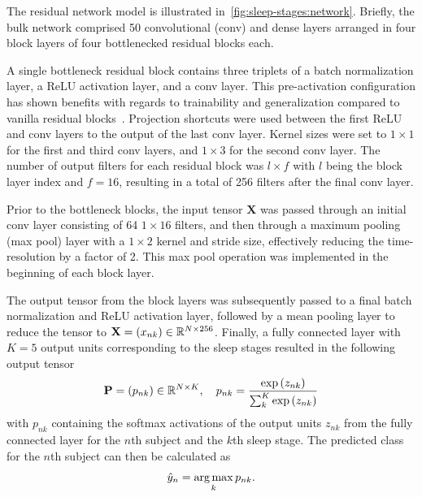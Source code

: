 The residual network model is illustrated in~\cref{fig:sleep-stages:network}. 
Briefly, the bulk network comprised 50 convolutional (conv) and dense layers arranged in four block layers of four bottlenecked residual blocks each. 

A single bottleneck residual block contains three triplets of a batch normalization layer, a \ac{ReLU} activation layer, and a conv layer. 
This pre-activation configuration has shown benefits with regards to trainability and generalization compared to vanilla residual blocks~\cite{He2016b}.
Projection shortcuts were used between the first \ac{ReLU} and conv layers to the output of the last conv layer.
Kernel sizes were set to $1\times1$ for the first and third conv layers, and $1\times3$ for the second conv layer.
The number of output filters for each residual block was $l\times f$ with $l$ being the block layer index and $f=16$, resulting in a total of 256 filters after the final conv layer.

Prior to the bottleneck blocks, the input tensor $\mathbf{X}$ was passed through an initial conv layer consisting of 64 $1\times16$ filters, and then through a maximum pooling (max pool) layer with a $1\times2$ kernel and stride size, effectively reducing the time-resolution by a factor of 2.
This max pool operation was implemented in the beginning of each block layer.

The output tensor from the block layers was subsequently passed to a final batch normalization and \ac{ReLU} activation layer, followed by a mean pooling layer to reduce the tensor to $\mathbf{X} = \left(x_{nk}\right) \in \real{N\times 256}$.
Finally, a fully connected layer with $K=5$ output units corresponding to the sleep stages resulted in the following output tensor
\begin{equation}
    \mathbf{P} = \left(p_{nk}\right) \in \real{N \times K}, \quad p_{nk} = \frac{\exp{(z_{nk})}}{\sum_{k}^{K} \exp{(z_{nk})}}
\end{equation}
with $p_{nk}$ containing the softmax activations of the output units $z_{nk}$ from the fully connected layer for the $n$th subject and the $k$th sleep stage.
The predicted class for the $n$th subject can then be calculated as
\begin{equation}\label{eq:argmax}
    \hat{y}_n = \operatorname*{arg\,max}_{k} p_{nk}.
\end{equation}

